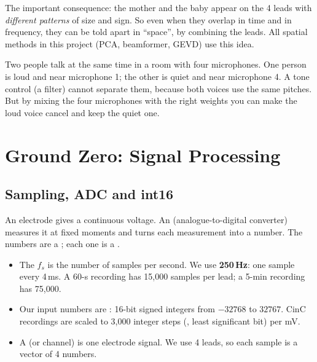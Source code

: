 \documentclass[11pt]{article}
\begin{document}
\begin{simple}
The important consequence: the mother and the baby appear on the 4 leads with \emph{different patterns} of size and sign. So even when they overlap in time and in frequency, they can be told apart in ``space'', by combining the leads. All spatial methods in this project (PCA, beamformer, GEVD) use this idea.
\end{simple}

\begin{analogy}
Two people talk at the same time in a room with four microphones. One person is loud and near microphone 1; the other is quiet and near microphone 4. A tone control (a filter) cannot separate them, because both voices use the same pitches. But by mixing the four microphones with the right weights you can make the loud voice cancel and keep the quiet one.
\end{analogy}

\begin{viva}
\end{viva}
\begin{viva}
\end{viva}
\section{Ground Zero: Signal Processing}
\label{sec:dsp}

\subsection{Sampling, ADC and int16}
\label{sec:sampling}
An electrode gives a continuous voltage. An  (analogue-to-digital converter) measures it at fixed moments and turns each measurement into a number. The numbers are a ; each one is a .

\begin{itemize}
  \item The  $f_s$ is the number of samples per second. We use \textbf{250\,Hz}: one sample every 4\,ms. A 60-s recording has 15,000 samples per lead; a 5-min recording has 75,000.
  \item Our input numbers are : 16-bit signed integers from $-32768$ to $32767$. CinC recordings are scaled to 3,000 integer steps (, least significant bit) per mV.
  \item A  (or channel) is one electrode signal. We use 4 leads, so each sample is a vector of 4 numbers.
\end{itemize}
\end{document}
